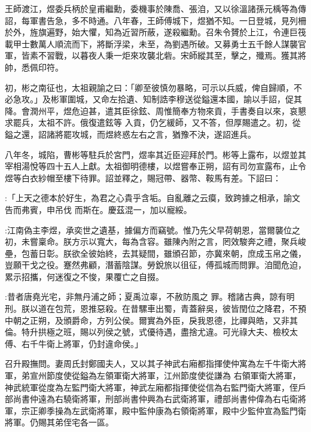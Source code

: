 \begin{pinyinscope}
 王師渡江，煜委兵柄於皇甫繼勳，委機事於陳喬、張洎，又以徐溫諸孫元楀等為傳詔，每軍書告急，多不時通。八年春，王師傅城下，煜猶不知。一日登城，見列柵於外，旌旗遍野，始大懼，知為近習所蔽，遂殺繼勳。召朱令贇於上江，令連巨筏
 載甲士數萬人順流而下，將斷浮梁，未至，為劉遇所破。又募勇士五千餘人謀襲官軍，皆素不習戰，以暮夜人秉一炬來攻襲北砦。宋師縱其至，擊之，殲焉。獲其將帥，悉佩印符。



 初，彬之南征也，太祖親諭之曰：「卿至彼慎勿暴略，可示以兵威，俾自歸順，不必急攻。」及彬軍圍城，又命左拾遺、知制誥李穆送從鎰還本國，諭以手詔，促其降。會潤州平，煜危迫甚，遣其臣徐鉉、周惟簡奉方物來貢，手書奏自以來，哀懇求罷兵，太祖不許。俄復遣鉉等
 入貢，仍乞緩師，又不答，但厚賜遣之。初，從鎰之還，詔諸將罷攻城，而煜終惑左右之言，猶豫不決，遂詔進兵。



 八年冬，城陷，曹彬等駐兵於宮門，煜率其近臣迎拜於門。彬等上露布，以煜並其宰相湯悅等四十五人上獻。太祖御明德樓，以煜嘗奉正朔，詔有司勿宣露布，止令煜等白衣紗帽至樓下待罪。詔並釋之，賜冠帶、器幣、鞍馬有差。下詔曰：



 :「上天之德本於好生，為君之心貴乎含垢。自亂離之云瘼，致跨據之相承，諭文告而弗賓，申吊伐
 而斯在。慶茲混一，加以寵綏。



 :江南偽主李煜，承奕世之遺基，據偏方而竊號。惟乃先父早荷朝恩，當爾襲位之初，未嘗稟命。朕方示以寬大，每為含容。雖陳內附之言，罔效駿奔之禮，聚兵峻壘，包蓄日彰。朕欲全彼始終，去其疑間，雖頒召節，亦冀來朝，庶成玉帛之儀，豈願干戈之役。蹇然弗顧，潛蓄陰謀。勞銳旅以徂征，傅孤城而問罪。洎聞危迫，累示招攜，何迷復之不悛，果覆亡之自掇。



 :昔者唐堯光宅，非無丹浦之師；夏禹泣辜，不赦防風之
 罪。稽諸古典，諒有明刑。朕以道在包荒，恩推惡殺。在昔騾車出蜀，青蓋辭吳，彼皆閏位之降君，不預中朝之正朔，及頒爵命，方列公侯。爾實為外臣，戾我恩德，比禪與皓，又非其倫。特升拱極之班，賜以列侯之號，式優待遇，盡捨尤違。可光祿大夫、檢校太傅、右千牛衛上將軍，仍封違命侯。」



 召升殿撫問。妻周氏封鄭國夫人，又以其子神武右廂都指揮使仲寓為左千牛衛大將軍，弟宣州節度使從鎰為左領軍衛大將軍，江州節度使從謙為
 右領軍衛大將軍，神武統軍從度為左監門衛大將軍，神武左廂都指揮使從信為右監門衛大將軍，侄戶部尚書仲遠為右驍衛將軍，刑部尚書仲興為右武衛將軍，禮部尚書仲偉為右屯衛將軍，宗正卿季操為左武衛將軍，殿中監仲康為右領衛將軍，殿中少監仲宣為監門衛將軍。仍賜其弟侄宅各一區。




\end{pinyinscope}
